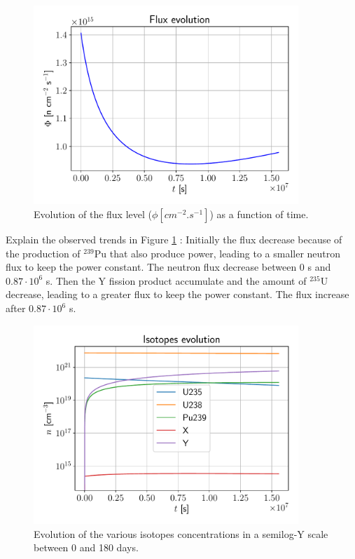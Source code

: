 \documentclass[11pt,a4paper]{article}
\begin{document}
\begin{figure}[H]
	\includegraphics[width=10cm]{fig/Ex5_Phi.pdf}
	\centering
	\caption{Evolution of the flux level ($\phi [cm^{-2}.s^{-1}]$) as a function of time.}
	\label{err}
\end{figure}
Explain the observed trends in Figure \ref{err} : Initially the flux decrease because of the production of $^{239}$Pu that also produce power, leading to a smaller neutron flux to keep the power constant. The neutron flux decrease between 0 s and $0.87 \cdot 10^6$ s. Then the Y fission product accumulate and the amount of $^{235}$U decrease, leading to a greater flux to keep the power constant. The flux increase after $0.87 \cdot 10^6$ s.

\begin{figure}[H]
	\includegraphics[width=10cm]{fig/Ex5_isotopes.pdf}
	\centering
	\caption{Evolution of the various isotopes concentrations in a semilog-Y scale  between 0 and 180 days.}
	\label{err2}
\end{figure} 
\end{document}
